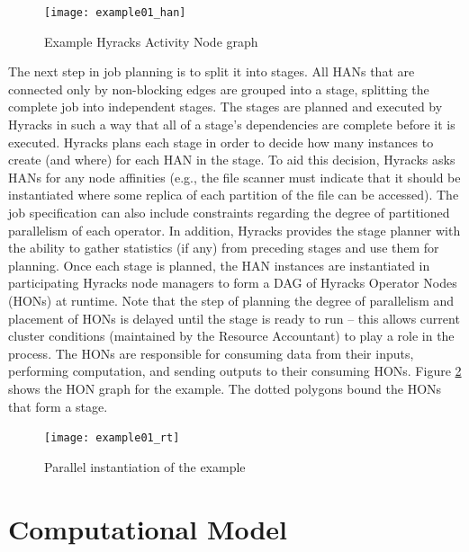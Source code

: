 {\begin{figure}
\centering
\texttt{[image: example01\_han]}
\caption{Example Hyracks Activity Node graph}\label{fig:example01_han}
\end{figure}

The next step in job planning is to split it into stages. All HANs that are connected only by non-blocking edges are grouped into a stage, splitting the complete job into independent stages. The stages are planned and executed by Hyracks in such a way that all of a stage's dependencies are complete before it is executed. Hyracks plans each stage in order to decide how many instances to create (and where) for each HAN in the stage. To aid this decision, Hyracks asks HANs for any node affinities (e.g., the file scanner must indicate that it should be instantiated where some replica of each partition of the file can be accessed). The job specification can also include constraints regarding the degree of partitioned parallelism of each operator. In addition, Hyracks provides the stage planner with the ability to gather statistics (if any) from preceding stages and use them for planning. Once each stage is planned, the HAN instances are instantiated in participating Hyracks node managers to form a DAG of Hyracks Operator Nodes (HONs) at runtime. Note that the step of planning the degree of parallelism and placement of HONs is delayed until the stage is ready to run -- this allows current cluster conditions (maintained by the Resource Accountant) to play a role in the process. The HONs are responsible for consuming data from their inputs, performing computation, and sending outputs to their consuming HONs. Figure \ref{fig:example01_rt} shows the HON graph for the example. The dotted polygons bound the HONs that form a stage.

\begin{figure}
\centering
\texttt{[image: example01\_rt]}
\caption{Parallel instantiation of the example}\label{fig:example01_rt}
\end{figure}

}


\section{Computational Model}
\label{ch:hyracks:sec:model}


